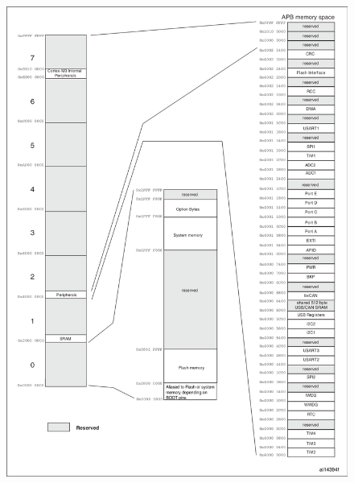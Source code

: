 \begin{figure}[!h]
	\includegraphics[width=\textwidth]{images/content/MemoryMap.png}
	\label{memoryMap}
\end{figure}
\par 
